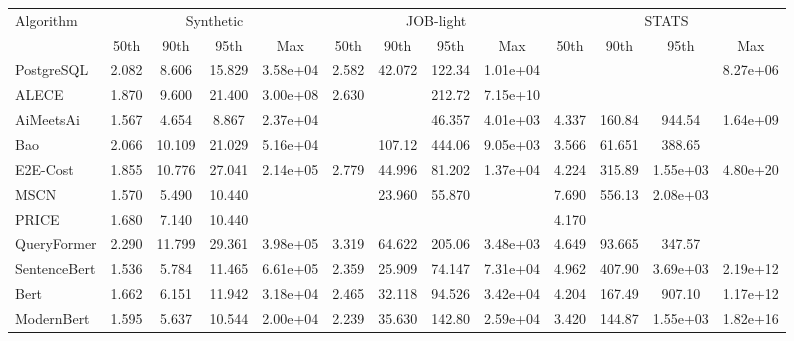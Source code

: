 \begin{tabular}{l|cccc|cccc|cccc}

\toprule

\multirow{2}{*}{Algorithm} & \multicolumn{4}{c|}{Synthetic} & \multicolumn{4}{c|}{JOB-light} & \multicolumn{4}{c|}{STATS} \\

 & 50th & 90th & 95th & Max & 50th & 90th & 95th & Max & 50th & 90th & 95th & Max \\

\midrule

PostgreSQL & 2.082 & 8.606 & 15.829 & 3.58e+04 & 2.582 & 42.072 & 122.34 & 1.01e+04 & \cellcolor{green5}{2.153} & \cellcolor{green3}{38.993} & \cellcolor{green4}{126.09} & 8.27e+06 \\
ALECE & 1.870 & 9.600 & 21.400 & 3.00e+08 & 2.630 & \cellcolor{green1}{14.990} & 212.72 & 7.15e+10 & \cellcolor{green3}{2.780} & \cellcolor{green5}{13.360} & \cellcolor{green5}{25.150} & \cellcolor{green4}{7.58e+03} \\
AiMeetsAi & 1.567 & 4.654 & 8.867 & 2.37e+04 & \cellcolor{green5}{1.629} & \cellcolor{green2}{14.769} & 46.357 & 4.01e+03 & 4.337 & 160.84 & 944.54 & 1.64e+09 \\
Bao & 2.066 & 10.109 & 21.029 & 5.16e+04 & \cellcolor{green1}{2.042} & 107.12 & 444.06 & 9.05e+03 & 3.566 & 61.651 & 388.65 & \cellcolor{green1}{5.33e+06} \\
E2E-Cost & 1.855 & 10.776 & 27.041 & 2.14e+05 & 2.779 & 44.996 & 81.202 & 1.37e+04 & 4.224 & 315.89 & 1.55e+03 & 4.80e+20 \\
MSCN & 1.570 & 5.490 & 10.440 & \cellcolor{green5}{1.93e+03} & \cellcolor{green3}{1.830} & 23.960 & 55.870 & \cellcolor{green1}{752.69} & 7.690 & 556.13 & 2.08e+03 & \cellcolor{green3}{1.00e+06} \\
PRICE & 1.680 & 7.140 & 10.440 & \cellcolor{green3}{5.10e+03} & \cellcolor{green2}{2.030} & \cellcolor{green3}{13.990} & \cellcolor{green3}{32.510} & \cellcolor{green5}{309.66} & 4.170 & \cellcolor{green4}{28.690} & \cellcolor{green1}{195.94} & \cellcolor{green5}{1.81e+03} \\
QueryFormer & 2.290 & 11.799 & 29.361 & 3.98e+05 & 3.319 & 64.622 & 205.06 & 3.48e+03 & 4.649 & 93.665 & 347.57 & \cellcolor{green2}{2.81e+06} \\
\midrule

SentenceBert & 1.536 & 5.784 & 11.465 & 6.61e+05 & 2.359 & 25.909 & 74.147 & 7.31e+04 & 4.962 & 407.90 & 3.69e+03 & 2.19e+12 \\
Bert & 1.662 & 6.151 & 11.942 & 3.18e+04 & 2.465 & 32.118 & 94.526 & 3.42e+04 & 4.204 & 167.49 & 907.10 & 1.17e+12 \\
ModernBert & 1.595 & 5.637 & 10.544 & 2.00e+04 & 2.239 & 35.630 & 142.80 & 2.59e+04 & 3.420 & 144.87 & 1.55e+03 & 1.82e+16 \\
\midrule


\end{tabular}
